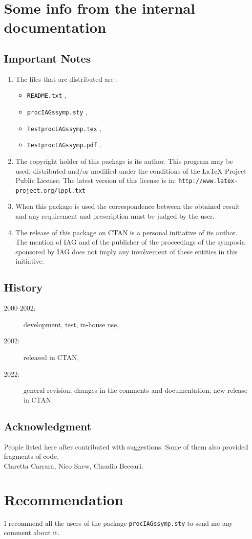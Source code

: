\documentclass[a4paper,twocolumn,10pt]{article} %
\begin{document}
\section{Some info from the internal documentation}
\subsection{Important Notes}
\begin{enumerate}
\item The files that are distributed are : 
\begin{itemize}
\item \verb+README.txt+ ,
\item \verb+procIAGssymp.sty+ ,
\item \verb+TestprocIAGssymp.tex+ ,
\item \verb+TestprocIAGssymp.pdf+ .
\end{itemize}
\item The copyright holder of this package is its author.
This program may be used, distributed and/or modified under 
the conditions of the LaTeX Project Public License.
The latest version of this license is in: 
\texttt{http://www.latex-project.org/lppl.txt}
\item When this package is used the correspondence between the
obtained result and any requirement and prescription
must  be judged by the user.
\item The release of this package on CTAN is a personal initiative 
of its author. The mention of IAG and of the publisher 
of the proceedings of the symposia sponsored by IAG does 
not imply any involvement of these entities in this initiative. 
\end{enumerate}
\subsection{History}
\begin{description}
\item[2000-2002:] development, test, in-house use,
\item[2002:] released in CTAN,
\item[2022:] general revision,  
changes in the comments and documentation, new release in CTAN.
\end{description}
% 
\subsection{Acknowledgment}
People listed here after contributed with suggestions.
Some of them also provided fragments of code. \\
Claretta Carrara, Nico Snew, Claudio Beccari.
%
\section{Recommendation}
I recommend all the users of the package \texttt{procIAGssymp.sty}
to send me any comment about it. 
\end{document}
